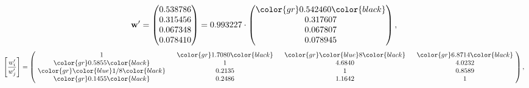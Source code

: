 \begin{example}
\begin{equation*}
\mathbf{w}^{\prime} =
\begin{pmatrix}
0.538786\\
0.315456\\
0.067348\\
0.078410
\end{pmatrix} =
0.993227\cdot
\begin{pmatrix}
\color{gr} 0.542460\color{black} \\
0.317607\\
0.067807\\
0.078945
\end{pmatrix},
\end{equation*}
\begin{equation*}
\left[ \frac{{w}^{\prime}_i}{{w}^{\prime}_j} \right] =
\begin{pmatrix}
$\,\,$ 1 $\,\,$ & $\,\,$\color{gr} 1.7080\color{black} $\,\,$ & $\,\,$\color{gr} \color{blue} 8\color{black} $\,\,$ & $\,\,$\color{gr} 6.8714\color{black} $\,\,$ \\
$\,\,$\color{gr} 0.5855\color{black} $\,\,$ & $\,\,$ 1 $\,\,$ & $\,\,$4.6840$\,\,$ & $\,\,$4.0232  $\,\,$ \\
$\,\,$\color{gr} \color{blue}  1/8\color{black} $\,\,$ & $\,\,$0.2135$\,\,$ & $\,\,$ 1 $\,\,$ & $\,\,$0.8589 $\,\,$ \\
$\,\,$\color{gr} 0.1455\color{black} $\,\,$ & $\,\,$0.2486$\,\,$ & $\,\,$1.1642$\,\,$ & $\,\,$ 1  $\,\,$ \\
\end{pmatrix},
\end{equation*}
\end{example}
\newpage
